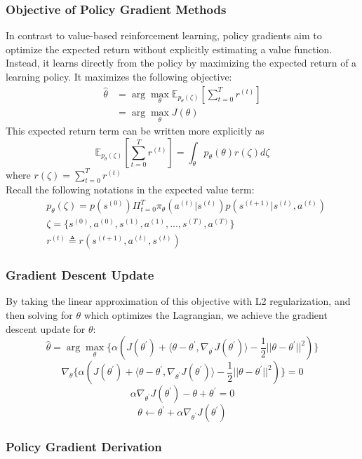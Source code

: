 \documentclass[11pt]{article}
\begin{document}
\subsubsection{Objective of Policy Gradient Methods}
\normalfont
In contrast to value-based reinforcement learning, policy gradients aim to optimize the expected return without explicitly estimating a value function. Instead, it learns directly from the policy by maximizing the expected return of a learning policy. It maximizes the following objective:
\begin{align*}
    \hat{\theta} &= \arg \max\limits_{\theta} \mathbb{E}_{p_\theta(\zeta)}\left[\sum\limits_{t=0}^Tr^{(t)}\right] \\
    &= \arg\max\limits_{\theta} J(\theta)
\end{align*}
This expected return term can be written more explicitly as 
$$\mathbb{E}_{p_\theta(\zeta)}\left[\sum\limits_{t=0}^Tr^{(t)}\right] = \int_\theta p_\theta(\theta)r(\zeta)d\zeta $$
where $r(\zeta) = \sum\limits^{T}_{t=0} r^{(t)}$\\
Recall the following notations in the expected value term:
\begin{align*}
    & p_\theta(\zeta) = p(s^{(0)})\Pi_{t=0}^T\pi_\theta(a^{(t)}|s^{(t)})p(s^{(t+1)}|s^{(t)}, a^{(t)}) \\
    & \zeta  = \{s^{(0)}, a^{(0)}, s^{(1)}, a^{(1)}, ..., s^{(T)}, a^{(T)}\} \\
    & r^{(t)} \triangleq r(s^{(t+1)}, a^{(t)}, s^{(t)})
\end{align*}

\subsubsection{Gradient Descent Update}

By taking the linear approximation of this objective with L2 regularization, and then solving for $\theta$ which optimizes the Lagrangian, we achieve the gradient descent update for $\theta$:
$$\hat{\theta} = \arg\max\limits_{\theta}\Big\{\alpha(J(\theta^{'})+\langle\theta-\theta^{'}, \nabla_{\theta^{'}}J(\theta^{'})\rangle - \frac{1}{2}||\theta-\theta^{'}||^2)\Big\}$$
$$\nabla_\theta\{\alpha(J(\theta^{'})+\langle\theta-\theta^{'}, \nabla_{\theta^{'}}J(\theta^{'})\rangle - \frac{1}{2}||\theta-\theta^{'}||^2)\} = 0 $$
$$\alpha\nabla_{\theta^{'}}J(\theta^{'}) - \theta + \theta^{'} = 0$$
$$\theta \leftarrow \theta^{'} + \alpha \nabla_{\theta^{'}}J(\theta^{'})$$

\subsubsection{Policy Gradient Derivation}
\end{document}
